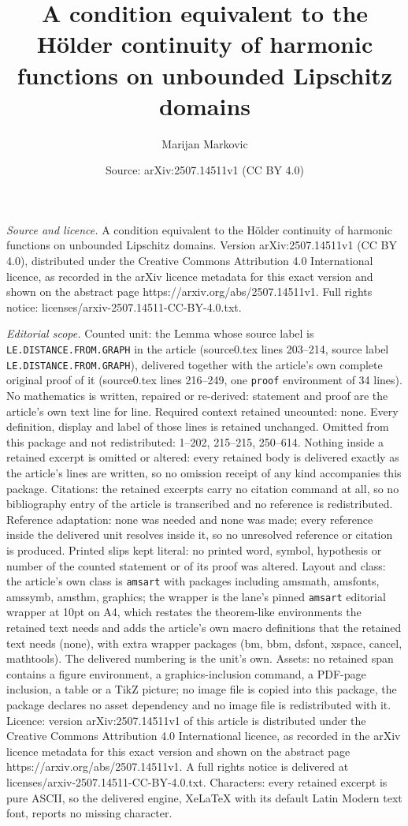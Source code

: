 \documentclass[10pt,a4paper]{amsart}
\title[A condition equivalent to the H\"{o}lder continuity of harmo]{A condition equivalent to the H\"{o}lder continuity of harmonic functions on unbounded Lipschitz domains}
\author{Marijan Markovic}
\date{Source: arXiv:2507.14511v1 (CC BY 4.0)}
\begin{document}
\maketitle

\noindent\emph{Source and licence.} A condition equivalent to the H\"{o}lder continuity of harmonic functions on unbounded Lipschitz domains. Version arXiv:2507.14511v1 (CC BY 4.0), distributed under the Creative Commons Attribution 4.0 International licence, as recorded in the arXiv licence metadata for this exact version and shown on the abstract page https://arxiv.org/abs/2507.14511v1. Full rights notice: licenses/arxiv-2507.14511-CC-BY-4.0.txt.\par\smallskip

\noindent\textit{Editorial scope.} Counted unit: the Lemma whose source label is \texttt{LE.DISTANCE.FROM.GRAPH} in the article (source0.tex lines 203--214, source label \texttt{LE.DISTANCE.FROM.GRAPH}), delivered together with the article's own complete original proof of it (source0.tex lines 216--249, one \texttt{proof} environment of 34 lines). No mathematics is written, repaired or re-derived: statement and proof are the article's own text line for line. Required context retained uncounted: none. Every definition, display and label of those lines is retained unchanged. Omitted from this package and not redistributed: 1--202, 215--215, 250--614. Nothing inside a retained excerpt is omitted or altered: every retained body is delivered exactly as the article's lines are written, so no omission receipt of any kind accompanies this package. Citations: the retained excerpts carry no citation command at all, so no bibliography entry of the article is transcribed and no reference is redistributed. Reference adaptation: none was needed and none was made; every reference inside the delivered unit resolves inside it, so no unresolved reference or citation is produced. Printed slips kept literal: no printed word, symbol, hypothesis or number of the counted statement or of its proof was altered. Layout and class: the article's own class is \texttt{amsart} with packages including amsmath, amsfonts, amssymb, amsthm, graphics; the wrapper is the lane's pinned \texttt{amsart} editorial wrapper at 10pt on A4, which restates the theorem-like environments the retained text needs and adds the article's own macro definitions that the retained text needs (none), with extra wrapper packages (bm, bbm, dsfont, xspace, cancel, mathtools). The delivered numbering is the unit's own. Assets: no retained span contains a figure environment, a graphics-inclusion command, a PDF-page inclusion, a table or a TikZ picture; no image file is copied into this package, the package declares no asset dependency and no image file is redistributed with it. Licence: version arXiv:2507.14511v1 of this article is distributed under the Creative Commons Attribution 4.0 International licence, as recorded in the arXiv licence metadata for this exact version and shown on the abstract page https://arxiv.org/abs/2507.14511v1. A full rights notice is delivered at licenses/arxiv-2507.14511-CC-BY-4.0.txt. Characters: every retained excerpt is pure ASCII, so the delivered engine, XeLaTeX with its default Latin Modern text font, reports no missing character.
\end{document}
